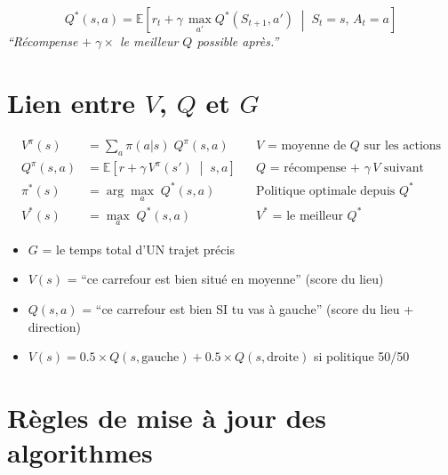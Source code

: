 \documentclass[11pt,a4paper]{article}
\newcommand{\E}{\mathbb{E}}
\begin{document}
\begin{formbox}
$$\boxed{Q^*(s,a) = \E\left[r_t + \gamma \, \max_{a'} Q^*(S_{t+1}, a') \;\middle|\; S_t = s, \, A_t = a\right]}$$
\textit{``Récompense $+\;\gamma \times$ le meilleur $Q$ possible après.''}
\end{formbox}

\section{Lien entre $V$, $Q$ et $G$}

\begin{formbox}
\begin{align}
V^\pi(s) &= \sum_a \pi(a|s) \; Q^\pi(s,a) && \text{$V$ = moyenne de $Q$ sur les actions} \\[6pt]
Q^\pi(s,a) &= \E\left[r + \gamma \, V^\pi(s') \;\middle|\; s, a\right] && \text{$Q$ = récompense + $\gamma \, V$ suivant} \\[6pt]
\pi^*(s) &= \arg\max_a \; Q^*(s,a) && \text{Politique optimale depuis $Q^*$} \\[6pt]
V^*(s) &= \max_a \; Q^*(s,a) && \text{$V^*$ = le meilleur $Q^*$}
\end{align}
\end{formbox}

\begin{exbox}
\begin{itemize}[nosep]
\item $G$ = le temps total d'UN trajet précis
\item $V(s)$ = ``ce carrefour est bien situé en moyenne'' (score du lieu)
\item $Q(s, a)$ = ``ce carrefour est bien SI tu vas à gauche'' (score du lieu + direction)
\item $V(s) = 0.5 \times Q(s, \text{gauche}) + 0.5 \times Q(s, \text{droite})$ si politique 50/50
\end{itemize}
\end{exbox}

\section{Règles de mise à jour des algorithmes}
\end{document}
